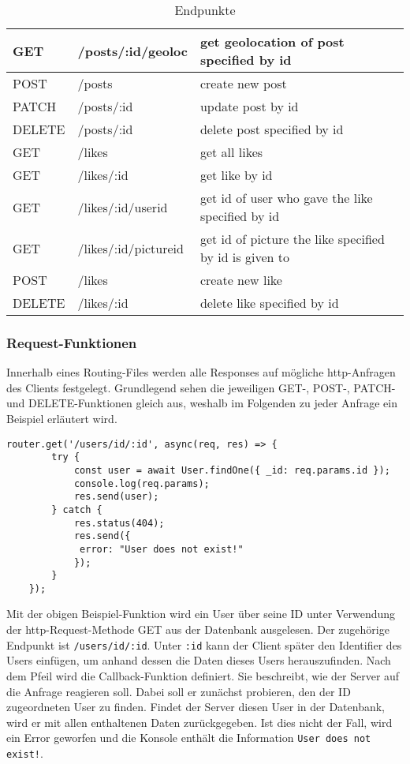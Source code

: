 \begin{table}[!htb]
\begin{tabularx}{\textwidth}{|x|X|X|}
    \hline
    GET & /posts/:id/geoloc & get geolocation of post specified by id\\
    \hline
    POST & /posts & create new post\\
    \hline
    PATCH & /posts/:id & update post by id\\
    \hline
    DELETE & /posts/:id & delete post specified by id\\
    \hline
    \hline
    GET & /likes & get all likes\\
    \hline
    GET & /likes/:id & get like by id\\
    \hline
    GET & /likes/:id/userid & get id of user who gave the like specified by id \\
    \hline
    GET & /likes/:id/pictureid & get id of picture the like specified by id is given to\\
    \hline
    POST & /likes & create new like\\
    \hline
    DELETE & /likes/:id & delete like specified by id\\
    \hline
\end{tabularx}
\caption{Endpunkte}
\label{endpunkte}
\end{table}

\subsubsection{Request-Funktionen}
Innerhalb eines Routing-Files werden alle Responses auf mögliche http-Anfragen des Clients festgelegt. Grundlegend sehen die jeweiligen GET-, POST-, PATCH- und DELETE-Funktionen gleich aus, weshalb im Folgenden zu jeder Anfrage ein Beispiel erläutert wird.

\begin{lstlisting}[caption=GET-Request, label=lst:getrequest]
    router.get('/users/id/:id', async(req, res) => {
        try {
            const user = await User.findOne({ _id: req.params.id });
            console.log(req.params);
            res.send(user);
        } catch {
            res.status(404);
            res.send({
             error: "User does not exist!"
            });
        }
    });
\end{lstlisting}

Mit der obigen Beispiel-Funktion wird ein User über seine ID unter Verwendung der http-Request-Methode GET aus der Datenbank ausgelesen. Der zugehörige Endpunkt ist \texttt{/users/id/:id}. Unter \texttt{:id} kann der Client später den Identifier des Users einfügen, um anhand dessen die Daten dieses Users herauszufinden. Nach dem Pfeil wird die Callback-Funktion definiert. Sie beschreibt, wie der Server auf die Anfrage reagieren soll. Dabei soll er zunächst probieren, den der ID zugeordneten User zu finden. Findet der Server diesen User in der Datenbank, wird er mit allen enthaltenen Daten zurückgegeben. Ist dies nicht der Fall, wird ein Error geworfen und die Konsole enthält die Information \texttt{User does not exist!}.

